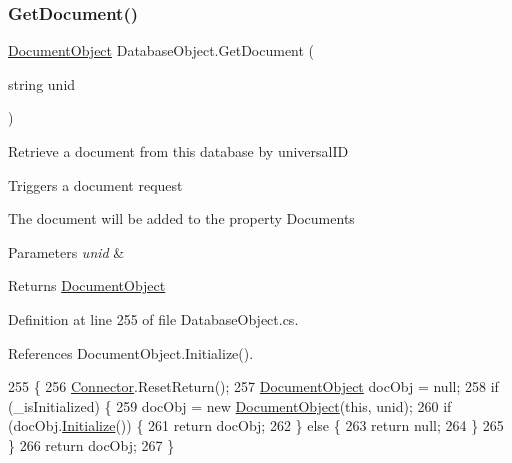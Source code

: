 \subsubsection{\texorpdfstring{Get\+Document()}{GetDocument()}}
{\footnotesize\ttfamily \mbox{\hyperlink{class_document_object}{Document\+Object}} Database\+Object.\+Get\+Document (\begin{DoxyParamCaption}\item[{string}]{unid }\end{DoxyParamCaption})}



Retrieve a document from this database by universal\+ID 

Triggers a document request

The document will be added to the property \textquotesingle{}Documents\textquotesingle{}


\begin{DoxyParams}{Parameters}
{\em unid} & \\
\hline
\end{DoxyParams}
\begin{DoxyReturn}{Returns}
\mbox{\hyperlink{class_document_object}{Document\+Object}}
\end{DoxyReturn}


Definition at line 255 of file Database\+Object.\+cs.



References Document\+Object.\+Initialize().


\begin{DoxyCode}
255                                                    \{
256         \mbox{\hyperlink{class_connector}{Connector}}.ResetReturn();
257         \mbox{\hyperlink{class_document_object}{DocumentObject}} docObj = null;
258         \textcolor{keywordflow}{if} (\_isInitialized) \{
259             docObj = \textcolor{keyword}{new} \mbox{\hyperlink{class_document_object}{DocumentObject}}(\textcolor{keyword}{this}, unid);
260             \textcolor{keywordflow}{if}  (docObj.\mbox{\hyperlink{class_document_object_af4298d6cfbb9ea60643d9995309b73f1}{Initialize}}()) \{
261                 \textcolor{keywordflow}{return} docObj;
262             \} \textcolor{keywordflow}{else} \{
263                 \textcolor{keywordflow}{return} null;
264             \}
265         \}
266         \textcolor{keywordflow}{return} docObj;
267     \}
\end{DoxyCode}
\mbox{\label{class_database_object_a9be31ba852e56a107e93f7d925f8a0c3}} 

